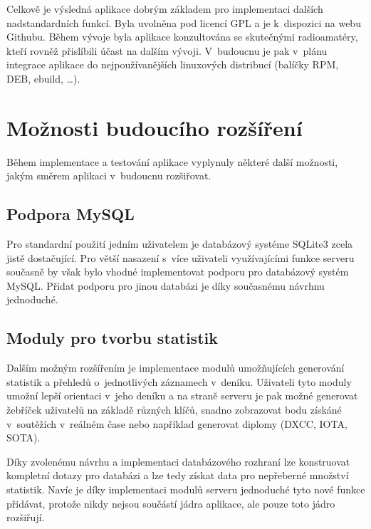 Celkově je výsledná aplikace dobrým základem pro implementaci dalších nadstandardních funkcí. Byla uvolněna pod licencí
GPL a je k~dispozici na webu Githubu. Během vývoje byla aplikace konzultována se skutečnými radioamatéry, kteří rovněž
přislíbili účast na dalším vývoji. V~budoucnu je pak v~plánu integrace aplikace
do nejpoužívanějších linuxových distribucí (balíčky RPM, DEB, ebuild, \ldots).


\section{Možnosti budoucího rozšíření}

Během implementace a testování aplikace vyplynuly některé další možnosti, jakým směrem aplikaci v~budoucnu rozšiřovat.

\subsection{Podpora MySQL}

Pro standardní použití jedním uživatelem je databázový systéme SQLite3 zcela jistě dostačující.
Pro větší nasazení s~více uživateli využívajícími funkce serveru současně by však bylo vhodné implementovat podporu pro databázový
systém MySQL. Přidat podporu pro jinou databázi je díky současnému návrhnu jednoduché.

\subsection{Moduly pro tvorbu statistik}

Dalším možným rozšířením je implementace modulů umožňujících generování statistik a přehledů o~jednotlivých záznamech v~deníku.
Uživateli tyto moduly umožní lepší orientaci v~jeho deníku a na straně serveru je pak možné generovat žebříček uživatelů na
základě různých klíčů, snadno zobrazovat bodu získáné v~soutěžích v~reálném čase nebo například generovat diplomy
(DXCC, IOTA, SOTA).

Díky zvolenému návrhu a implementaci databázového rozhraní lze konstruovat kompletní dotazy pro databázi a lze tedy získat
data pro nepřeberné množství statistik. Navíc je díky implementaci modulů serveru jednoduché tyto nové funkce přidávat,
protože nikdy nejsou součástí jádra aplikace, ale pouze toto jádro rozšiřují.


